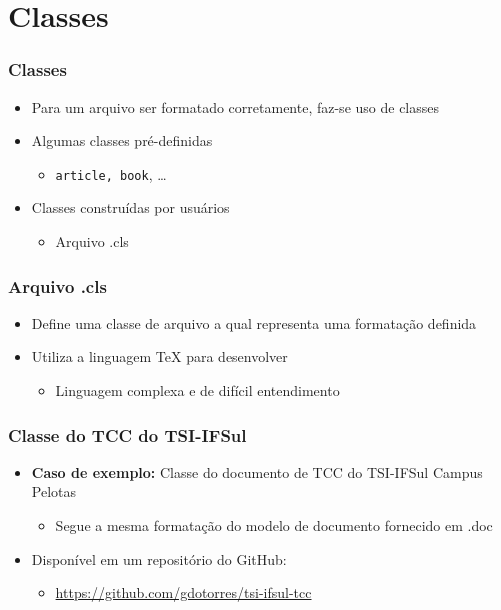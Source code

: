 \section{Classes}

\begin{frame} \frametitle{Classes}
\begin{itemize}
	\item Para um arquivo ser formatado corretamente, faz-se uso de classes
	\item Algumas classes pré-definidas
	\begin{itemize}
		\item \texttt{article, book}, \ldots
	\end{itemize}
	\item Classes construídas por usuários
	\begin{itemize}
		\item Arquivo .cls
	\end{itemize}
\end{itemize}
\end{frame}

\begin{frame} \frametitle{Arquivo .cls}
\begin{itemize}
	\item Define uma classe de arquivo a qual representa uma formatação definida
	\item Utiliza a linguagem TeX para desenvolver
	\begin{itemize}
		\item Linguagem complexa e de difícil entendimento
	\end{itemize}
\end{itemize}
\end{frame}

\begin{frame} \frametitle{Classe do TCC do TSI-IFSul}
\begin{itemize}
	\item \textbf{Caso de exemplo:} Classe do documento de TCC do TSI-IFSul Campus Pelotas
	\begin{itemize}
		\item Segue a mesma formatação do modelo de documento fornecido em .doc
	\end{itemize}
	\item Disponível em um repositório do GitHub:
	\begin{itemize}
		\item \url{https://github.com/gdotorres/tsi-ifsul-tcc}
	\end{itemize}
\end{itemize}
\end{frame}

